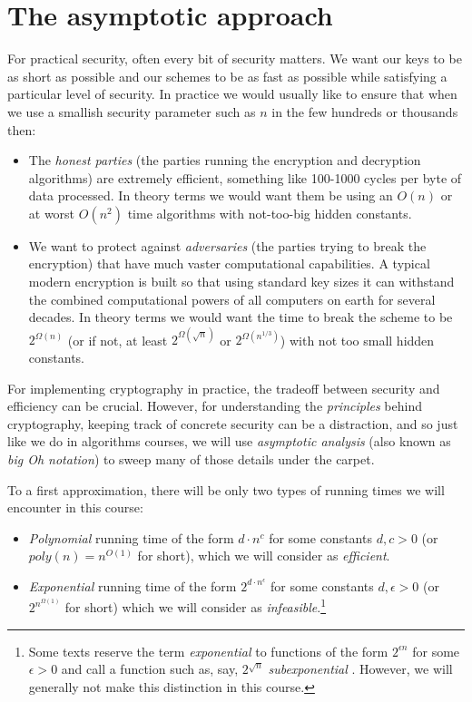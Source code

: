 \section{The asymptotic approach}\label{2-The-asymptotic-approac}

For practical security, often every bit of security matters. We want our
keys to be as short as possible and our schemes to be as fast as
possible while satisfying a particular level of security. In practice we
would usually like to ensure that when we use a smallish security
parameter such as \(n\) in the few hundreds or thousands then:

\begin{itemize}
\item
  The \emph{honest parties} (the parties running the encryption and
  decryption algorithms) are extremely efficient, something like
  100-1000 cycles per byte of data processed. In theory terms we would
  want them be using an \(O(n)\) or at worst \(O(n^2)\) time algorithms
  with not-too-big hidden constants.
\item
  We want to protect against \emph{adversaries} (the parties trying to
  break the encryption) that have much vaster computational
  capabilities. A typical modern encryption is built so that using
  standard key sizes it can withstand the combined computational powers
  of all computers on earth for several decades. In theory terms we
  would want the time to break the scheme to be \(2^{\Omega(n)}\) (or if
  not, at least \(2^{\Omega(\sqrt{n})}\) or \(2^{\Omega(n^{1/3})}\))
  with not too small hidden constants.
\end{itemize}

For implementing cryptography in practice, the tradeoff between security
and efficiency can be crucial. However, for understanding the
\emph{principles} behind cryptography, keeping track of concrete
security can be a distraction, and so just like we do in algorithms
courses, we will use \emph{asymptotic analysis} (also known as \emph{big
Oh notation}) to sweep many of those details under the carpet.

To a first approximation, there will be only two types of running times
we will encounter in this course:

\begin{itemize}
\item
  \emph{Polynomial} running time of the form \(d\cdot n^c\) for some
  constants \(d,c>0\) (or \(poly(n)=n^{O(1)}\) for short), which we will
  consider as \emph{efficient}.
\item
  \emph{Exponential} running time of the form
  \(2^{d\cdot n^{\epsilon}}\) for some constants \(d,\epsilon >0\) (or
  \(2^{n^{\Omega(1)}}\) for short) which we will consider as
  \emph{infeasible}.\footnote{Some texts reserve the term
    \emph{exponential} to functions of the form \(2^{\epsilon n}\) for
    some \(\epsilon > 0\) and call a function such as, say,
    \(2^{\sqrt{n}}\) \emph{subexponential} . However, we will generally
    not make this distinction in this course.}
\end{itemize}

